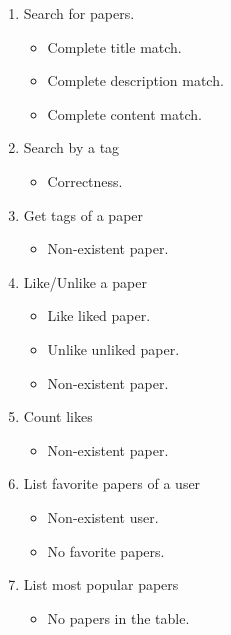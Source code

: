 \documentclass{article}
\begin{document}
\begin{enumerate}[start=3]
\begin{enumerate}
        \item Search for papers.
        \begin{itemize}
            \item Complete title match.
            \item Complete description match.
            \item Complete content match.
        \end{itemize}

        \item Search by a tag
        \begin{itemize}
            \item Correctness.
        \end{itemize}

        \item Get tags of a paper
        \begin{itemize}
            \item Non-existent paper.
        \end{itemize}

        \item Like/Unlike a paper
        \begin{itemize}
            \item Like liked paper.
            \item Unlike unliked paper.
            \item Non-existent paper.
        \end{itemize}

        \item Count likes
        \begin{itemize}
            \item Non-existent paper.
        \end{itemize}

        \item List favorite papers of a user
        \begin{itemize}
            \item Non-existent user.
            \item No favorite papers.
        \end{itemize}

        \item List most popular papers
        \begin{itemize}
            \item No papers in the table.
        \end{itemize}


\end{enumerate}
\end{enumerate}
\end{document}
